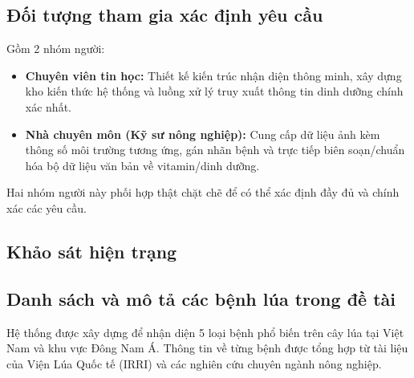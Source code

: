 \documentclass[12pt,a4paper]{article}
\begin{document}
\subsection{Đối tượng tham gia xác định yêu cầu}
Gồm 2 nhóm người:
\begin{itemize}
    \item \textbf{Chuyên viên tin học:} Thiết kế kiến trúc nhận diện thông minh, xây dựng kho kiến thức hệ thống và luồng xử lý truy xuất thông tin dinh dưỡng chính xác nhất.
    \item \textbf{Nhà chuyên môn (Kỹ sư nông nghiệp):} Cung cấp dữ liệu ảnh kèm thông số môi trường tương ứng, gán nhãn bệnh và trực tiếp biên soạn/chuẩn hóa bộ dữ liệu văn bản về vitamin/dinh dưỡng.
\end{itemize}
Hai nhóm người này phối hợp thật chặt chẽ để có thể xác định đầy đủ và chính xác các yêu cầu.

\hrulefill

\subsection{Khảo sát hiện trạng}
\subsection{Danh sách và mô tả các bệnh lúa trong đề tài}
Hệ thống được xây dựng để nhận diện 5 loại bệnh phổ biến trên cây lúa tại Việt Nam và khu vực Đông Nam Á. Thông tin về từng bệnh được tổng hợp từ tài liệu của Viện Lúa Quốc tế (IRRI) và các nghiên cứu chuyên ngành nông nghiệp.

\vspace{0.3cm}
\end{document}
